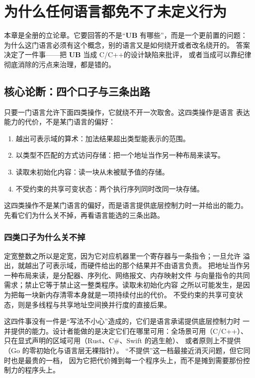 \documentclass[12pt,a4paper,fontset=fandol]{ctexbook}
\newcommand{\Lang}[1]{\textsf{#1}}
\newcommand{\CL}{\Lang{C}}
\newcommand{\CPP}{\Lang{C++}}
\newcommand{\UB}{\textbf{\textsf{UB}}}
\begin{document}
\chapter{为什么任何语言都免不了未定义行为}\label{ch:ub02-inevitable}

本章是全册的立论章。它要回答的不是“\UB{} 有哪些”，而是一个更前置的问题：
为什么这门语言必须有这个概念，别的语言又是如何绕开或者改名绕开的。
答案决定了一件事——把 \UB{} 当成 \CL/\CPP 的设计缺陷来批评，
或者当成可以靠纪律彻底消除的污点来治理，都是错的。

\section{核心论断：四个口子与三条出路}\label{sec:ub02-trilemma}

只要一门语言允许下面四类操作，它就绕不开一次取舍。这四类操作是语言
表达能力的代价，不是某门语言的偏好：

\begin{enumerate}
  \item 越出可表示域的算术：加法结果超出类型能表示的范围。
  \item 以类型不匹配的方式访问存储：把一个地址当作另一种布局来读写。
  \item 读取未初始化内容：读一块从未被赋予值的存储。
  \item 不受约束的共享可变状态：两个执行序列同时改同一块存储。
\end{enumerate}

这四类操作不是某门语言的偏好，而是语言提供底层控制力时一并给出的能力。
先看它们为什么关不掉，再看语言能选的三条出路。

\subsection{四类口子为什么关不掉}\label{sec:ub02-why-open}

定宽整数之所以是定宽，因为它对应机器里一个寄存器与一条指令；一旦允许
溢出，就越出了可表示域，而硬件给出的那个结果并不由语言负责。
把地址当作另一种布局来读，是分配器、序列化、网络报文、内存映射文件
与向量指令的共同需求；禁止它等于禁止这一整类程序。读取未初始化内容
之所以可能发生，是因为把每一块新内存清零本身就是一项持续付出的代价。
不受约束的共享可变状态，则是多线程与共享地址空间换并行度的直接后果。

这四件事没有一件是“写法不小心”造成的，它们是语言承诺提供底层控制力时
一并提供的能力。设计者能做的是决定它们在哪里可用：全场景可用（\CL/\CPP）、
只在显式声明的区域可用（\Lang{Rust}、\Lang{C\#}、\Lang{Swift} 的逃生舱）、
或者原则上不提供（\Lang{Go} 的零初始化与语言层无裸指针）。
“不提供”这一档最接近消灭问题，但它同时也是最贵的一档，
因为它把代价摊到每一个程序头上，而不是摊到需要那份控制力的程序头上。
\end{document}
